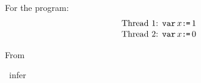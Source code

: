 For the program:
\begin{align*}
\mbox{Thread 1: } &\texttt{var}\, x\texttt{:}\mkern-1mu\texttt{=}\, 1 \\[-.5ex]
\mbox{Thread 2: } &\texttt{var}\, x\texttt{:}\mkern-1mu\texttt{=}\, 0 
\end{align*}
\begin{displaymathsmall}
\mbox{From  }
\begin{tikzcenter}[node distance=1em]
\end{tikzcenter}
\mbox{ infer   }
\begin{tikzcenter}[node distance=1em]
\end{tikzcenter}
\end{displaymathsmall}


\endinput

We say that $\aCmd$ has an \emph{SC race} if there is some pomset in $\semsc{\aCmd}$ that contains a data race.


In this section we show that if $\semsc{\aCmd}\subseteq\sem{\aCmd}$ has only
race-free executions, then each pomset $\aPS\in\sem{\aCmd}$ is ``equivalent''
to some $\aPS'\in\semsc{\aCmd}$, where $\aPS'$ may have more events, but
preserves labeling and has less order.

We say that $\aPS\suborder\aPS'$ if there is an injection
$\inj:\Event'\rightarrow\Event$ such that:
\begin{itemize}
\item $\labelingAct'(\aEv) = \labelingAct(\inj(\aEv))$
\item $\labelingForm'(\aEv)$ implies $\labelingForm(\inj(\aEv))$
\item $\labelingForm(\bEv)$ implies $\bigvee_{\aEv\in\inj^{-1}(\bEv)}(\labelingForm'(\aEv))$
\item $\aEv\le'\bEv$ implies $\inj(\aEv)\le\inj(\bEv)$
\item $\aEv\gtN'\bEv$ implies $\inj(\aEv)\gtN\inj(\bEv)$
\end{itemize}

